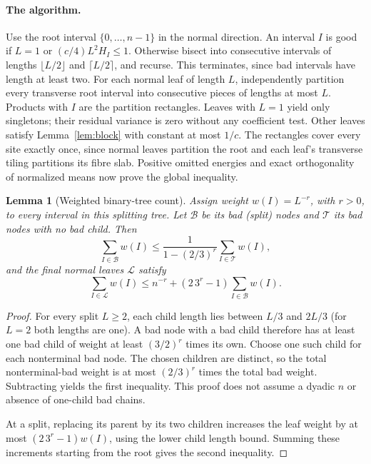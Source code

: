 \documentclass[11pt]{article}
\newtheorem{lemma}{Lemma}
\begin{document}
\paragraph{The algorithm.}
Use the root interval $\{0,\ldots,n-1\}$ in the normal direction. An interval $I$ is good if $L=1$ or $(c/4)L^2H_I\le1$. Otherwise bisect into consecutive intervals of lengths $\lfloor L/2\rfloor$ and $\lceil L/2\rceil$, and recurse. This terminates, since bad intervals have length at least two. For each normal leaf of length $L$, independently partition every transverse root interval into consecutive pieces of lengths at most $L$. Products with $I$ are the partition rectangles. Leaves with $L=1$ yield only singletons; their residual variance is zero without any coefficient test. Other leaves satisfy Lemma~\ref{lem:block} with constant at most $1/c$. The rectangles cover every site exactly once, since normal leaves partition the root and each leaf's transverse tiling partitions its fibre slab. Positive omitted energies and exact orthogonality of normalized means now prove the global inequality.

\begin{lemma}[Weighted binary-tree count]\label{lem:tree}
Assign weight $w(I)=L^{-r}$, with $r>0$, to every interval in this splitting tree. Let $\mathcal B$ be its bad (split) nodes and $\mathcal T$ its bad nodes with no bad child. Then
\[
 \sum_{I\in\mathcal B}w(I)\le
 \frac{1}{1-(2/3)^r}\sum_{I\in\mathcal T}w(I),
\]
and the final normal leaves $\mathcal L$ satisfy
\[
 \sum_{I\in\mathcal L}w(I)\le n^{-r}
 +(2\,3^r-1)\sum_{I\in\mathcal B}w(I).
\]
\end{lemma}
\begin{proof}
For every split $L\ge2$, each child length lies between $L/3$ and $2L/3$ (for $L=2$ both lengths are one). A bad node with a bad child therefore has at least one bad child of weight at least $(3/2)^r$ times its own. Choose one such child for each nonterminal bad node. The chosen children are distinct, so the total nonterminal-bad weight is at most $(2/3)^r$ times the total bad weight. Subtracting yields the first inequality. This proof does not assume a dyadic $n$ or absence of one-child bad chains.

At a split, replacing its parent by its two children increases the leaf weight by at most $(2\,3^r-1)w(I)$, using the lower child length bound. Summing these increments starting from the root gives the second inequality.
\end{proof}
\end{document}
